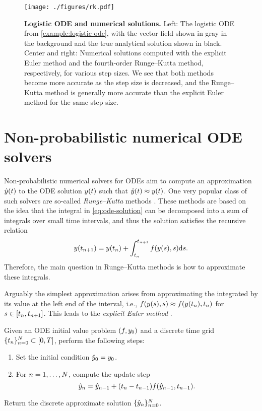 \documentclass{mimosis}
\begin{document}
\begin{figure}[t]
\centering
\texttt{[image: ./figures/rk.pdf]}
\caption{\label{fig:rk}\textbf{Logistic ODE and numerical solutions.} Left: The logistic ODE from \cref{example:logistic-ode}, with the vector field shown in gray in the background and the true analytical solution shown in black. Center and right: Numerical solutions computed with the explicit Euler method and the fourth-order Runge--Kutta method, respectively, for various step sizes. We see that both methods become more accurate as the step size is decreased, and the Runge--Kutta method is generally more accurate than the explicit Euler method for the same step size.}
\end{figure}
\section{Non-probabilistic numerical ODE solvers}
\label{sec:org4e3e63a}
Non-probabilistic numerical solvers for ODEs aim to compute an approximation \(\hat{y}(t)\) to the ODE solution \(y(t)\) such that
\(\hat{y}(t) \approx y(t)\).
One very popular class of such solvers are so-called \emph{Runge--Kutta} methods
\parencite{Runge1895,kutta1901beitrag,hairer2008solving}.
These methods are based on the idea that the integral in \cref{eq:ode-solution} can be decomposed into a sum of integrals over small time intervals, and thus the solution satisfies the recursive relation
\begin{equation}
  \val(t_{\idxt+1}) = \val(t_\idxt) + \int_{t_\idxt}^{t_{\idxt+1}} \vf( \val(s), s ) \dd s.
\end{equation}
Therefore, the main question in Runge--Kutta methods is how to approximate these integrals.

Arguably the simplest approximation arises from approximating the integrated by its value at the left end of the interval, i.e.,
\({\vf(\val(s), s) \approx \vf(\val(t_\idxt), t_\idxt)}\) for \(s \in [t_n, t_{n+1}]\).
This leads to the \emph{explicit Euler method} \parencite{euler1768institutionum}.
\begin{alg}
\algeqspacing
Given an ODE initial value problem \((\vf, \val_0)\) and a discrete time grid \(\{ t_n \}_{n=0}^N \subset [0, T]\), perform the following steps:
\begin{enumerate}[noitemsep]
\item Set the initial condition \(\hat{y}_0 = y_0\).
\item For \(n = 1, \ldots, N\), compute the update step
\begin{equation}
  \hat{\val}_\idxt = \hat{\val}_{\idxt-1} + (t_\idxt - t_{\idxt-1}) \vf(\hat{\val}_{\idxt-1}, t_{\idxt-1}).
\end{equation}
\end{enumerate}
Return the discrete approximate solution \(\{ \hat{y}_n \}_{n=0}^N\).
\end{alg}
\end{document}
